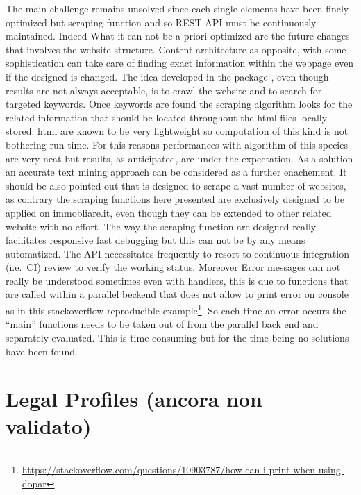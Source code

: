 \documentclass[
  12pt,
  a4paper,
  oneside]{book}
\DeclareRobustCommand{\href}[2]{#2\footnote{\url{#1}}}
\theoremstyle{definition}
\theoremstyle{definition}
\theoremstyle{definition}
\theoremstyle{remark}
\begin{document}
The main challenge remains unsolved since each single elements have been finely optimized but scraping function and so REST API must be continuously maintained. Indeed What it can not be a-priori optimized are the future changes that involves the website structure. Content architecture as opposite, with some sophistication can take care of finding exact information within the webpage even if the designed is changed. The idea developed in the package \citet{Rcrawler}, even though results are not always acceptable, is to crawl the website and to search for targeted keywords. Once keywords are found the scraping algorithm looks for the related information that should be located throughout the html files locally stored. html are known to be very lightweight so computation of this kind is not bothering run time. For this reasons performances with algorithm of this species are very neat but results, as anticipated, are under the expectation. As a solution an accurate text mining approach can be considered as a further enachement. It should be also pointed out that \citet{Rcrawler} is designed to scrape a vast number of websites, as contrary the scraping functions here presented are exclusively designed to be applied on immobliare.it, even though they can be extended to other related website with no effort.
The way the scraping function are designed really facilitates responsive fast debugging but this can not be by any means automatized. The API necessitates frequently to resort to continuous integration (i.e.~CI) review to verify the working status. Moreover Error messages can not really be understood sometimes even with handlers, this is due to functions that are called within a parallel beckend that does not allow to print error on console as in this \href{https://stackoverflow.com/questions/10903787/how-can-i-print-when-using-dopar}{stackoverflow reproducible example}. So each time an error occurs the ``main'' functions needs to be taken out of from the parallel back end and separately evaluated. This is time consuming but for the time being no solutions have been found.

\hypertarget{legal-profiles-ancora-non-validato}{%
\section{Legal Profiles (ancora non validato)}\label{legal-profiles-ancora-non-validato}}
\end{document}
